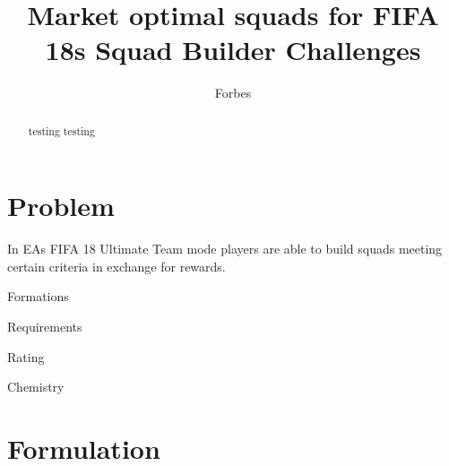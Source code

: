 \documentclass[]{article}
\title{Market optimal squads for FIFA 18s Squad Builder Challenges}
\author{Forbes}
\begin{document}
\maketitle



\begin{abstract}
testing testing

\end{abstract}

\section{Problem}

In EAs FIFA 18 Ultimate Team mode players are able to build squads meeting certain criteria in exchange for rewards.

Formations

Requirements

Rating

Chemistry


\section{Formulation}
\end{document}
